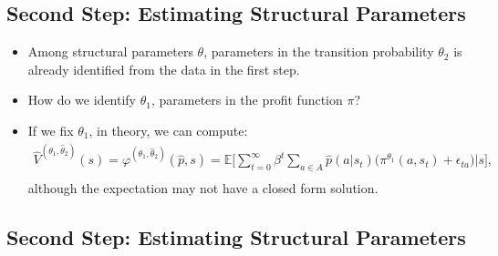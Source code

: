 \documentclass[
]{book}
\providecommand{\tightlist}{%
  \setlength{\itemsep}{0pt}\setlength{\parskip}{0pt}}
\begin{document}
\hypertarget{second-step-estimating-structural-parameters}{%
\subsection{Second Step: Estimating Structural Parameters}\label{second-step-estimating-structural-parameters}}

\begin{itemize}
\tightlist
\item
  Among structural parameters \(\theta\), parameters in the transition probability \(\theta_2\) is already identified from the data in the first step.
\item
  How do we identify \(\theta_1\), parameters in the profit function \(\pi\)?
\item
  If we fix \(\theta_1\), in theory, we can compute:
  \begin{equation}
  \begin{split}
  \hat{V}^{(\theta_1, \hat{\theta}_2)}(s) = \varphi^{(\theta_1, \hat{\theta}_2)}(\hat{p}, s) = \mathbb{E}\Bigg[ \sum_{t = 0}^\infty \beta^t \sum_{a \in A}\hat{p}(a|s_t)\Bigg(\pi^{\theta_1}(a, s_t) + \epsilon_{ta}\Bigg)\Bigg|s\Bigg],\\
  \end{split}
  \end{equation}
  although the expectation may not have a closed form solution.
\end{itemize}

\hypertarget{second-step-estimating-structural-parameters-1}{%
\subsection{Second Step: Estimating Structural Parameters}\label{second-step-estimating-structural-parameters-1}}
\end{document}
